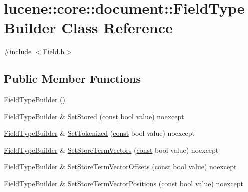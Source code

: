 \hypertarget{classlucene_1_1core_1_1document_1_1FieldTypeBuilder}{}\section{lucene\+:\+:core\+:\+:document\+:\+:Field\+Type\+Builder Class Reference}
\label{classlucene_1_1core_1_1document_1_1FieldTypeBuilder}


{\ttfamily \#include $<$Field.\+h$>$}

\subsection*{Public Member Functions}
\begin{DoxyCompactItemize}
\item 
\mbox{\hyperlink{classlucene_1_1core_1_1document_1_1FieldTypeBuilder_a7522c85b6ed23531fa0505461b34c723}{Field\+Type\+Builder}} ()
\item 
\mbox{\hyperlink{classlucene_1_1core_1_1document_1_1FieldTypeBuilder}{Field\+Type\+Builder}} \& \mbox{\hyperlink{classlucene_1_1core_1_1document_1_1FieldTypeBuilder_acfff42d8723b911f44099fbec4fc2f71}{Set\+Stored}} (\mbox{\hyperlink{ZlibCrc32_8h_a2c212835823e3c54a8ab6d95c652660e}{const}} bool value) noexcept
\item 
\mbox{\hyperlink{classlucene_1_1core_1_1document_1_1FieldTypeBuilder}{Field\+Type\+Builder}} \& \mbox{\hyperlink{classlucene_1_1core_1_1document_1_1FieldTypeBuilder_aaae201d3c6f31cbeca7c5f2f782e0afa}{Set\+Tokenized}} (\mbox{\hyperlink{ZlibCrc32_8h_a2c212835823e3c54a8ab6d95c652660e}{const}} bool value) noexcept
\item 
\mbox{\hyperlink{classlucene_1_1core_1_1document_1_1FieldTypeBuilder}{Field\+Type\+Builder}} \& \mbox{\hyperlink{classlucene_1_1core_1_1document_1_1FieldTypeBuilder_a506ea1479f84243ea0b46671ef39b4b9}{Set\+Store\+Term\+Vectors}} (\mbox{\hyperlink{ZlibCrc32_8h_a2c212835823e3c54a8ab6d95c652660e}{const}} bool value) noexcept
\item 
\mbox{\hyperlink{classlucene_1_1core_1_1document_1_1FieldTypeBuilder}{Field\+Type\+Builder}} \& \mbox{\hyperlink{classlucene_1_1core_1_1document_1_1FieldTypeBuilder_abe98f545d7ef994171a11abd1318de67}{Set\+Store\+Term\+Vector\+Offsets}} (\mbox{\hyperlink{ZlibCrc32_8h_a2c212835823e3c54a8ab6d95c652660e}{const}} bool value) noexcept
\item 
\mbox{\hyperlink{classlucene_1_1core_1_1document_1_1FieldTypeBuilder}{Field\+Type\+Builder}} \& \mbox{\hyperlink{classlucene_1_1core_1_1document_1_1FieldTypeBuilder_a598eeedd4fbfd6c2c945e6f4d1061159}{Set\+Store\+Term\+Vector\+Positions}} (\mbox{\hyperlink{ZlibCrc32_8h_a2c212835823e3c54a8ab6d95c652660e}{const}} bool value) noexcept

\end{DoxyCompactItemize}
